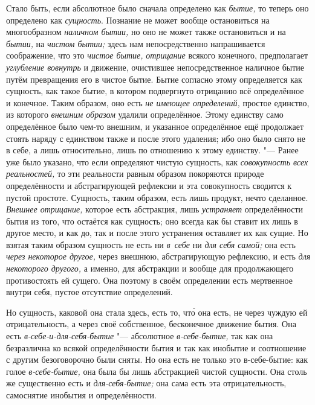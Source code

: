 Стало быть, если абсолютное было сначала определено как
{\em бытие,} то теперь оно определено как
{\em сущность}. Познание не может вообще остановиться
на многообразном {\em наличном бытии,} но оно не может
также остановиться и на {\em бытии,} на
{\em чистом бытии;} здесь нам непосредственно
напрашивается соображение, что это {\em чистое бытие,}
{\em отрицание} всякого конечного, предполагает
{\em углубление вовнутрь} и движение, очистившее
непосредственное наличное бытие путём превращения его в чистое бытие. Бытие
согласно этому определяется как сущность, как такое бытие, в котором
подвергнуто отрицанию всё определённое и конечное. Таким образом, оно есть
{\em не имеющее определений,} простое единство, из
которого {\em внешним образом} удалили определённое.
Этому единству само определённое было чем-то внешним, и указанное
определённое ещё продолжает стоять наряду с единством также и после этого
удаления; ибо оно было снято не в себе, а лишь относительно, лишь по
отношению к этому единству. "--- Ранее
уже было указано, что если определяют чистую сущность, как
{\em совокупность всех реальностей,} то эти реальности
равным образом покоряются природе определённости и абстрагирующей рефлексии
и эта совокупность сводится к пустой простоте. Сущность, таким образом,
есть лишь продукт, нечто сделанное. {\em Внешнее
отрицание,} которое есть абстракция, лишь
{\em устраняет} определённости бытия из того, что
остаётся как сущность; оно
всегда как бы ставит их лишь в другое место, и как до, так и после этого
устранения оставляет их как сущие. Но взятая таким образом сущность не есть
ни {\em в~себе} ни {\em для себя самой;} она есть {\em через некоторое другое,}
через внешнюю, абстрагирующую рефлексию, и есть {\em для
некоторого другого,} а именно, для абстракции и вообще для продолжающего
противостоять ей сущего. Она поэтому в своём определении есть мертвенное
внутри себя, пустое отсутствие определений.

Но сущность, каковой она стала здесь, есть то, чт\'{о} она есть, не через чуждую
ей отрицательность, а через своё собственное, бесконечное движение бытия.
Она есть {\em в-себе-и-для-себя-бытие} "--- абсолютное
{\em в-себе-бытие,} так как она безразлична ко всякой
определённости бытия и так как инобытие и соотношение с другим
безоговорочно были сняты. Но она есть не только это в-себе-бытие: как голое
{\em в-себе-бытие,} она была бы лишь абстракцией чистой
сущности. Она столь же существенно есть и
{\em для-себя-бытие;} она сама есть эта
отрицательность, самоснятие инобытия и определённости.

